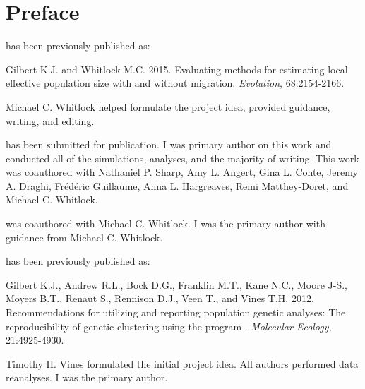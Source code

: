 \chapter*{Preface}


\textsc{} has been previously published as:
%
\begin{previouspaper}
  Gilbert K.J. and Whitlock M.C. 2015. Evaluating methods for estimating local effective 
  population size with and without migration. \emph{Evolution}, 68:2154-2166.
\end{previouspaper}
%
Michael C. Whitlock helped formulate the project idea, provided guidance, writing, and editing.

\textsc{} has been submitted for publication. %
I was primary author on this work and conducted all of the simulations, analyses, and the majority of writing. This work was coauthored with Nathaniel P. Sharp, Amy L. Angert, Gina L. Conte, Jeremy A. Draghi, Fr\'ed\'eric Guillaume, Anna L. Hargreaves, Remi Matthey-Doret, and Michael C. Whitlock.

\textsc{} was coauthored with Michael C. Whitlock. I was the primary author with guidance from Michael C. Whitlock.

\textsc{} has been previously published as:
%
\begin{previouspaper}
  Gilbert K.J., Andrew R.L., Bock D.G., Franklin M.T., Kane N.C., Moore J-S., Moyers B.T., Renaut S., Rennison D.J., Veen T., and Vines T.H. 2012. Recommendations for utilizing and reporting population genetic analyses: The reproducibility of genetic clustering using the program . \emph{Molecular Ecology}, 21:4925-4930.
\end{previouspaper}
%
Timothy H. Vines formulated the initial project idea. All authors performed data reanalyses. I was the primary author.

